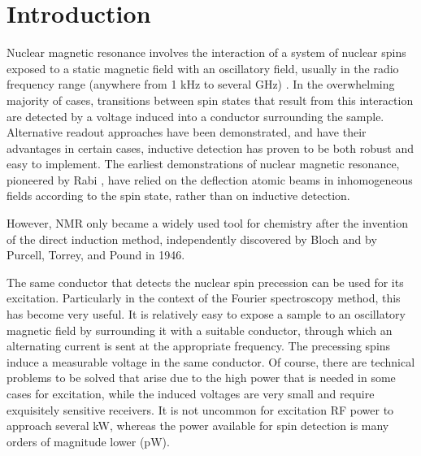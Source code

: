 

\section{Introduction}

Nuclear magnetic resonance involves the interaction of a system of nuclear spins exposed to a static 
magnetic field with an oscillatory field, usually in the radio frequency range (anywhere from 1 kHz to 
several GHz) \cite{Abragam:1961vg}. In the overwhelming majority of cases, transitions between spin
states that 
result from this interaction are detected by a voltage induced into a 
 conductor surrounding the sample. Alternative readout approaches have been demonstrated, and have 
their advantages in certain cases, inductive detection has proven to be both robust and 
easy to implement. The earliest demonstrations of nuclear magnetic resonance, pioneered 
by Rabi \cite{Rabi:1938tq}, have relied on the deflection atomic beams in inhomogeneous fields according to the spin state, rather than on inductive detection.

However, NMR only became a widely used tool for chemistry after the invention of the direct induction 
method, independently discovered by Bloch \cite{Bloch:1946hk} 
and by Purcell, Torrey, and Pound \cite{Purcell:1946ft} in 1946. 

The same conductor that detects the nuclear spin precession can be used for its excitation. 
Particularly in the context of the Fourier spectroscopy method,\cite{Ernst:1966cr} this has 
become very useful. It is relatively easy to expose a sample to an oscillatory magnetic field by 
surrounding it with a suitable conductor, through which an alternating current is sent at the appropriate 
frequency. The precessing spins induce a measurable voltage in the same conductor. Of course, there are 
technical problems to be solved that arise due to the high power that is needed in some cases for 
excitation, while the induced voltages are very small and require exquisitely sensitive receivers. It 
is not uncommon for excitation RF power to approach several kW, whereas the power available for spin 
detection is many orders of magnitude lower (pW).

